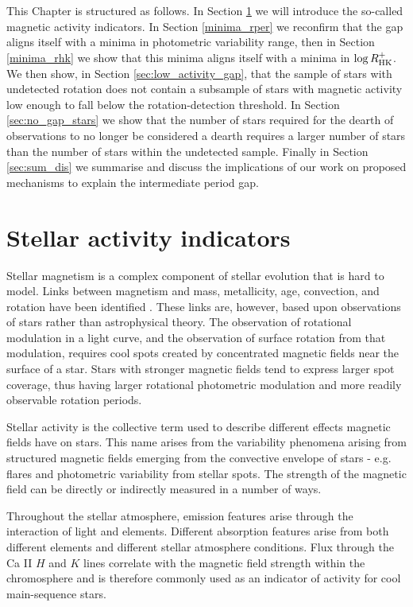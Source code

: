  
This Chapter is structured as follows. In Section \ref{sec:act_ind} we will introduce the so-called magnetic activity indicators. 
In Section \ref{minima_rper} we reconfirm that the gap aligns itself with a minima in photometric variability range, then in Section \ref{minima_rhk} we show that this minima aligns itself with a minima in $\log R^{+}_{\rm{HK}}$.
We then show, in Section \ref{sec:low_activity_gap}, that the sample of stars with undetected rotation does not contain a subsample of stars with magnetic activity low enough to fall below the rotation-detection threshold.
In Section \ref{sec:no_gap_stars} we show that the number of stars required for the dearth of observations to no longer be considered a dearth requires a larger number of stars than the number of stars within the undetected sample.
Finally in Section \ref{sec:sum_dis} we summarise and discuss the implications of our work on proposed mechanisms to explain the intermediate period gap.


\section{Stellar activity indicators}
\label{sec:act_ind}

Stellar magnetism is a complex component of stellar evolution that is hard to model.
Links between magnetism and mass, metallicity, age, convection, and rotation have been identified \citep{cao_starspots_2022}.
These links are, however, based upon observations of stars rather than astrophysical theory.
The observation of rotational modulation in a light curve, and the observation of surface rotation from that modulation, requires cool spots created by concentrated magnetic fields near the surface of a star.
Stars with stronger magnetic fields tend to express larger spot coverage, thus having larger rotational photometric modulation and more readily observable rotation periods.

Stellar activity is the collective term used to describe different effects magnetic fields have on stars.
This name arises from the variability phenomena arising from structured magnetic fields emerging from the convective envelope of stars - e.g. flares and photometric variability from stellar spots.
The strength of the magnetic field can be directly or indirectly measured in a number of ways.

Throughout the stellar atmosphere, emission features arise through the interaction of light and elements. 
Different absorption features arise from both different elements and different stellar atmosphere conditions. 
Flux through the Ca II $H$ and $K$ lines correlate with the magnetic field strength within the chromosphere and is therefore commonly used as an indicator of activity for cool main-sequence stars.


